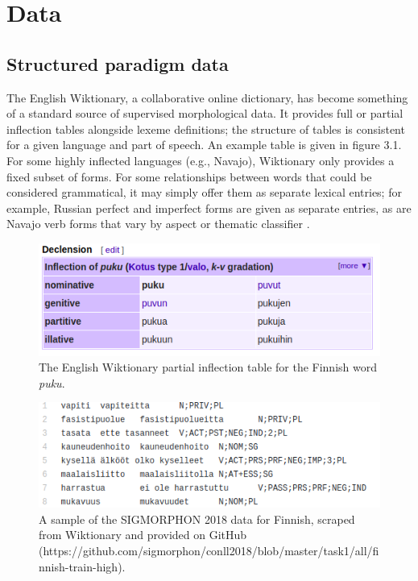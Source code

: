 \chapter{Data}

\section{Structured paradigm data}

The English Wiktionary, a collaborative online dictionary, has become something of a standard source of supervised morphological data. It provides full or partial inflection tables alongside lexeme definitions; the structure of tables is consistent for a given language and part of speech. An example table is given in figure 3.1. For some highly inflected languages (e.g., Navajo), Wiktionary only provides a fixed subset of forms. For some relationships between words that could be considered grammatical, it may simply offer them as separate lexical entries; for example, Russian perfect and imperfect forms are given as separate entries, as are Navajo verb forms that vary by aspect or thematic classifier \parencite{Wiktionary}.  

\begin{figure}[t]
\includegraphics[width=12cm]{images/puku.png}
\centering
\caption{The English Wiktionary partial inflection table for the Finnish word \textit{puku}.}
\end{figure}

\begin{figure}[t]
\includegraphics[width=12cm]{images/sigmorphon2018_fn.png}
\centering
\caption{A sample of the SIGMORPHON 2018 data for Finnish, scraped from Wiktionary and provided on GitHub (https://github.com/sigmorphon/conll2018/blob/master/task1/all/finnish-train-high).}
\end{figure}

